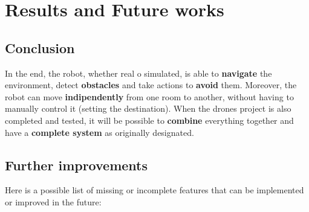 \chapter{Results and Future works}
\label{cha:futureworks}

\section{Conclusion}

In the end, the robot, whether real o simulated, is able to \textbf{navigate} the environment, detect \textbf{obstacles} and take actions to \textbf{avoid} them. Moreover, the robot can move \textbf{indipendently} from one room to another, without having to manually control it (setting the destination). When the drones project is also completed and tested, it will be possible to \textbf{combine} everything together and have a \textbf{complete system} as originally designated.

\section{Further improvements}

Here is a possible list of missing or incomplete features that can be implemented or improved in the future:

